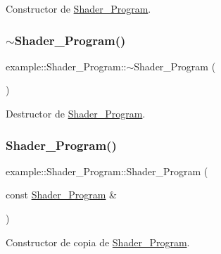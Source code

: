 Constructor de \mbox{\hyperlink{classexample_1_1_shader___program}{Shader\+\_\+\+Program}}. 

\mbox{\label{classexample_1_1_shader___program_a39b461d067ffc3a10662e1d4fcb6d689}} 
\subsubsection{\texorpdfstring{$\sim$Shader\_Program()}{~Shader\_Program()}}
{\footnotesize\ttfamily example\+::\+Shader\+\_\+\+Program\+::$\sim$\+Shader\+\_\+\+Program (\begin{DoxyParamCaption}{ }\end{DoxyParamCaption})\hspace{0.3cm}{\ttfamily [inline]}}



Destructor de \mbox{\hyperlink{classexample_1_1_shader___program}{Shader\+\_\+\+Program}}. 

\mbox{\label{classexample_1_1_shader___program_a94cce35e866d39287ee503150b262b6d}} 
\subsubsection{\texorpdfstring{Shader\_Program()}{Shader\_Program()}\hspace{0.1cm}{\footnotesize\ttfamily [2/2]}}
{\footnotesize\ttfamily example\+::\+Shader\+\_\+\+Program\+::\+Shader\+\_\+\+Program (\begin{DoxyParamCaption}\item[{const \mbox{\hyperlink{classexample_1_1_shader___program}{Shader\+\_\+\+Program}} \&}]{ }\end{DoxyParamCaption})\hspace{0.3cm}{\ttfamily [default]}}



Constructor de copia de \mbox{\hyperlink{classexample_1_1_shader___program}{Shader\+\_\+\+Program}}. 



